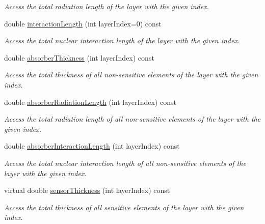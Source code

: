 \begin{DoxyCompactItemize}
\begin{DoxyCompactList}\small\item\em Access the total radiation length of the layer with the given index. \end{DoxyCompactList}\item 
double \hyperlink{class_d_d4hep_1_1_d_d_rec_1_1_layered_subdetector_a3e106be5eb09693c33502cfebdf95027}{interaction\+Length} (int layer\+Index=0) const
\begin{DoxyCompactList}\small\item\em Access the total nuclear interaction length of the layer with the given index. \end{DoxyCompactList}\item 
double \hyperlink{class_d_d4hep_1_1_d_d_rec_1_1_layered_subdetector_a192ffcc5da25ec4041b504da260eeae5}{absorber\+Thickness} (int layer\+Index) const
\begin{DoxyCompactList}\small\item\em Access the total thickness of all non-\/sensitive elements of the layer with the given index. \end{DoxyCompactList}\item 
double \hyperlink{class_d_d4hep_1_1_d_d_rec_1_1_layered_subdetector_a598c80799720b7eccd4d9ff747742024}{absorber\+Radiation\+Length} (int layer\+Index) const
\begin{DoxyCompactList}\small\item\em Access the total radiation length of all non-\/sensitive elements of the layer with the given index. \end{DoxyCompactList}\item 
double \hyperlink{class_d_d4hep_1_1_d_d_rec_1_1_layered_subdetector_a8baadf0d30a20c20b4d41d5e2ad1b60c}{absorber\+Interaction\+Length} (int layer\+Index) const
\begin{DoxyCompactList}\small\item\em Access the total nuclear interaction length of all non-\/sensitive elements of the layer with the given index. \end{DoxyCompactList}\item 
virtual double \hyperlink{class_d_d4hep_1_1_d_d_rec_1_1_layered_subdetector_a2bcb59309c2b579285e55daf4ccfbe3c}{sensor\+Thickness} (int layer\+Index) const
\begin{DoxyCompactList}\small\item\em Access the total thickness of all sensitive elements of the layer with the given index. \end{DoxyCompactList}\item 

\end{DoxyCompactItemize}
